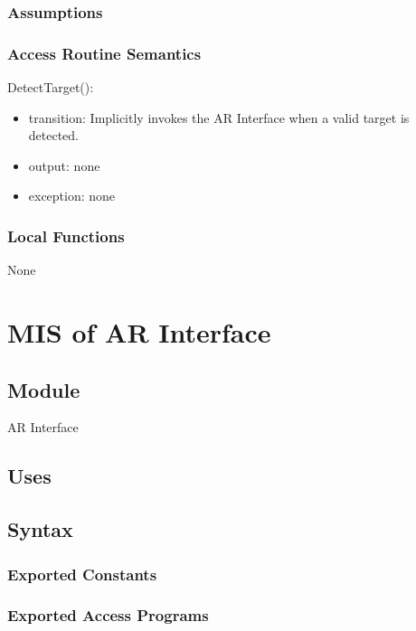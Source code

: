 \documentclass[12pt, titlepage]{article}
\begin{document}
\begin{itemize}
\subsubsection{Assumptions}

\subsubsection{Access Routine Semantics}

\noindent DetectTarget():
\begin{itemize}
\item transition: Implicitly invokes the AR Interface when a valid target is detected.
\item output: none
\item exception: none
\end{itemize}

\subsubsection{Local Functions}

None

\newpage

\section{MIS of AR Interface} \label{mARInterface}

\subsection{Module}

AR Interface

\subsection{Uses}

\subsection{Syntax}

\subsubsection{Exported Constants}

\subsubsection{Exported Access Programs}


\end{itemize}
\end{document}
